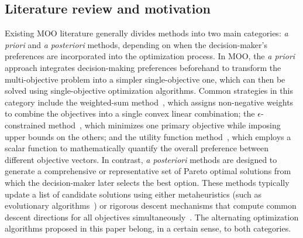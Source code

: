 \documentclass[11pt,a4paper]{article}
\numberwithin{equation}{section}%
\renewcommand{\(}{\left (}
\renewcommand{\)}{\right )}
\begin{document}
\subsection{Literature review and motivation}
Existing MOO literature generally divides methods into two main categories: \textit{a priori} and \textit{a posteriori} methods, depending on when the decision-maker's preferences are incorporated into the optimization process. 
In MOO, the \textit{a priori} approach integrates decision-making preferences beforehand to transform the multi-objective problem into a simpler single-objective one, which can then be solved using single-objective optimization algorithms. Common strategies in this category include the weighted-sum method~\cite{SGass_TSaaty_1955}, which assigns non-negative weights to combine the objectives into a single convex linear combination; the $\epsilon$-constrained method~\cite{YVHaimes_1971}, which minimizes one primary objective while imposing upper bounds on the others; and the utility function method~\cite{EKBrowning_MAZupan_2020, KMiettinen_2012}, which employs a scalar function to mathematically quantify the overall preference between different objective vectors.
In contrast, \textit{a posteriori} methods are designed to generate a comprehensive or representative set of Pareto optimal solutions from which the decision-maker later selects the best option. These methods typically update a list of candidate solutions using either metaheuristics (such as evolutionary algorithms~\cite{SBechikh_RDatta_AGupta_2016, CCCoello_2006}) or rigorous descent mechanisms that compute common descent directions for all objectives simultaneously~\cite{ALCustodio_etal_2011, JADesideri_2012, EHFukuda_LMGDrummond_2014}. The alternating optimization algorithms proposed in this paper belong, in a certain sense, to both categories. %
\end{document}
